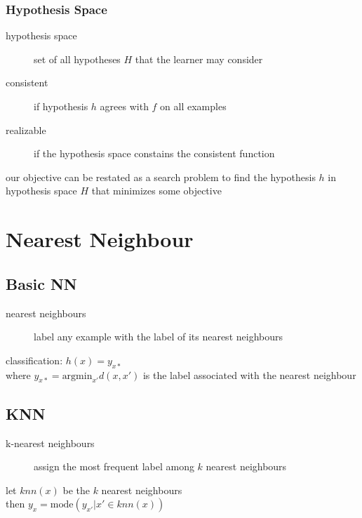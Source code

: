 \documentclass[]{article}
\theoremstyle{definition}
\begin{document}
\subsubsection{Hypothesis Space}
\begin{description}
    \item[hypothesis space] set of all hypotheses $H$ that the learner may consider
    \item[consistent] if hypothesis $h$ agrees with $f$ on all examples
    \item[realizable] if the hypothesis space constains the consistent function
\end{description}
our objective can be restated as a search problem to find the hypothesis $h$ in hypothesis space $H$ that minimizes some objective

\section{Nearest Neighbour}

\subsection{Basic NN}
\begin{description}
    \item[nearest neighbours] label any example with the label of its nearest neighbours
\end{description}
classification: $h(x) = y_{x*}$  \\
where $y_{x*} = \text{argmin}_{x'} d(x, x')$ is the label associated with the nearest neighbour

\subsection{KNN}
\begin{description}
    \item[k-nearest neighbours] assign the most frequent label among $k$ nearest neighbours
\end{description}
let $knn(x)$ be the $k$ nearest neighbours \\
then $y_x = \text{mode}({y_{x'}|x' \in knn(x)})$
\end{document}
